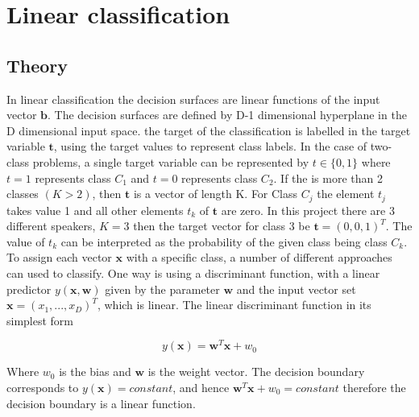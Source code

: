 \chapter{Linear classification}

\section{Theory}

In linear classification the decision surfaces are linear functions of the input vector $\mathbf{b}$. 
The decision surfaces are defined by D-1 dimensional hyperplane in the D dimensional input space.
the target of the classification is labelled in the target variable $\mathbf{t}$, using the target values to represent class labels. 
In the case of two-class problems, a single target variable can be represented by $t\in \lbrace 0,1\rbrace$ where $t = 1$ represents class $C_1$ and $t = 0$ represents class $C_2$.
If the is more than 2 classes $(K>2)$, then $\mathbf{t}$ is a vector of length K.
For Class $C_j$ the element $t_j$ takes value 1 and all other elements $t_k$ of $\mathbf{t}$ are zero.
In this project there are 3 different speakers, $K = 3$ then the target vector for class 3 be $\mathbf{t} = (0, 0, 1)^T$.
The value of $t_k$ can be interpreted as the probability of the given class being class $C_k$.
To assign each vector $\mathbf{x}$ with a specific class, a number of different approaches can used to classify.
One way is using a discriminant function, with a linear predictor $y(\mathbf{x},\mathbf{w})$ given by the parameter $\mathbf{w}$ and the input vector set $\mathbf{x}=(x_1,...,x_D)^T$, which is linear. 
The linear discriminant function in its simplest form

\begin{equation}
y(\mathbf{x}) = \mathbf{w}^T \mathbf{x}+w_0
\label{eq:lineDis}
\end{equation}

Where $w_0$ is the bias and $\mathbf{w}$ is the weight vector.
The decision boundary corresponds to $y(\mathbf{x})=constant$, and hence $\mathbf{w}^T \mathbf{x}+w_0 = constant$ therefore the decision boundary is a linear function.






